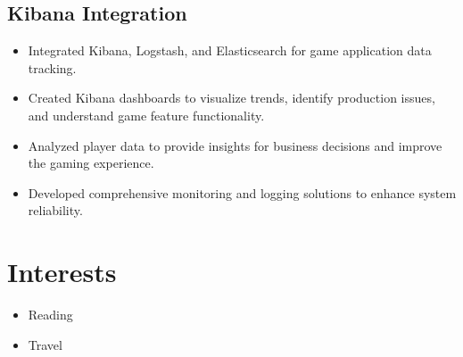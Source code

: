 \documentclass{article}%
\begin{document}
\subsection*{Kibana Integration}%
\label{subsec:KibanaIntegration}%
\begin{itemize}%
\item%
Integrated Kibana, Logstash, and Elasticsearch for game application data tracking.%
\item%
Created Kibana dashboards to visualize trends, identify production issues, and understand game feature functionality.%
\item%
Analyzed player data to provide insights for business decisions and improve the gaming experience.%
\item%
Developed comprehensive monitoring and logging solutions to enhance system reliability.%
\end{itemize}

%
\section*{Interests}%
\label{sec:Interests}%
\begin{itemize}%
\item%
Reading%
\item%
Travel%
\end{itemize}

%
\end{document}
